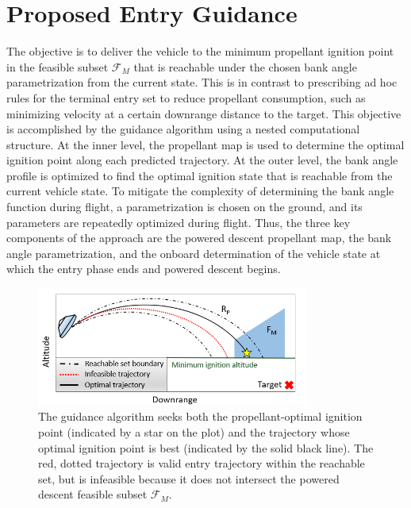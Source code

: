 \section{Proposed Entry Guidance}
The objective is to deliver the vehicle to the minimum propellant ignition point in the feasible subset $\mathcal{F}_M$ that is reachable under the chosen bank angle parametrization from the current state. This is in contrast to prescribing ad hoc rules for the terminal entry set to reduce propellant consumption, such as minimizing velocity at a certain downrange distance to the target. 
This objective is accomplished by the guidance algorithm using a nested computational structure. At the inner level, the propellant map is used to determine the optimal ignition point along each predicted trajectory. At the outer level, the bank angle profile is optimized to find the optimal ignition state that is reachable from the current vehicle state. To mitigate the complexity of determining the bank angle function during flight, a parametrization is chosen on the ground, and its parameters are repeatedly optimized during flight. Thus, the three key components of the approach are the powered descent propellant map, the bank angle parametrization, and the onboard determination of the vehicle state at which the entry phase ends and powered descent begins.  

\begin{figure}[h!]
	\centering
	\includegraphics[width=0.8\textwidth]{../AAS20/Optimization} 
	\caption{The guidance algorithm seeks both the propellant-optimal ignition point (indicated by a star on the plot) and the trajectory whose optimal ignition point is best (indicated by the solid black line). The red, dotted trajectory is valid entry trajectory within the reachable set, but is infeasible because it does not intersect the powered descent feasible subset $\mathcal{F}_M$.}
	\label{fig_optimization}
\end{figure}

